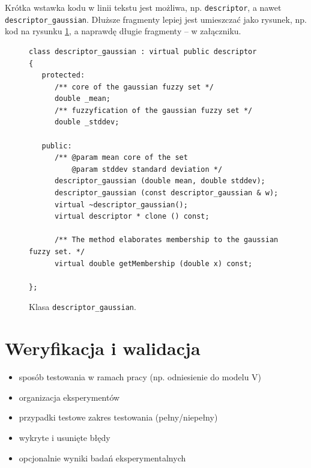 \documentclass[a4paper,twoside,12pt]{book}
\begin{document}
Krótka wstawka kodu w linii tekstu jest możliwa, np. \lstinline|descriptor|, a nawet \lstinline|descriptor_gaussian|. 
Dłuższe fragmenty lepiej jest umieszczać jako rysunek, np. kod na rysunku \ref{fig:pseudokod}, a naprawdę długie fragmenty – w załączniku.

\begin{figure}
\centering
\begin{lstlisting}
class descriptor_gaussian : virtual public descriptor
{
   protected:
      /** core of the gaussian fuzzy set */
      double _mean;
      /** fuzzyfication of the gaussian fuzzy set */
      double _stddev;
      
   public:
      /** @param mean core of the set
          @param stddev standard deviation */
      descriptor_gaussian (double mean, double stddev);
      descriptor_gaussian (const descriptor_gaussian & w);
      virtual ~descriptor_gaussian();
      virtual descriptor * clone () const;
      
      /** The method elaborates membership to the gaussian fuzzy set. */
      virtual double getMembership (double x) const;
     
};
\end{lstlisting}
\caption{Klasa \lstinline|descriptor_gaussian|.}
\label{fig:pseudokod}
\end{figure}


\chapter{Weryfikacja i walidacja}
\begin{itemize}
\item sposób testowania w ramach pracy (np. odniesienie do modelu V)
\item organizacja eksperymentów
\item przypadki testowe zakres testowania (pełny/niepełny)
\item wykryte i usunięte błędy
\item opcjonalnie wyniki badań eksperymentalnych
\end{itemize}
\end{document}

